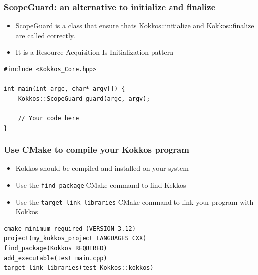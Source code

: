 \documentclass[aspectratio=169]{beamer}
\begin{document}

\begin{frame}[fragile]
    \frametitle{ScopeGuard: an alternative to initialize and finalize} 

    \begin{itemize}
        \item ScopeGuard is a class that ensure thats Kokkos::initialize and Kokkos::finalize are called correctly.
        \item It is a Resource Acquisition Is Initialization pattern
    \end{itemize}

\begin{verbatim}
#include <Kokkos_Core.hpp>
    
int main(int argc, char* argv[]) {
    Kokkos::ScopeGuard guard(argc, argv);
        
    // Your code here
}
\end{verbatim}

\end{frame}


\begin{frame}[fragile]

\frametitle{Use CMake to compile your Kokkos program}

\begin{itemize}
    \item Kokkos should be compiled and installed on your system
    \item Use the \texttt{find\_package} CMake command to find Kokkos
    \item Use the \texttt{target\_link\_libraries} CMake command to link your program with Kokkos
\end{itemize}

\begin{verbatim}
cmake_minimum_required (VERSION 3.12)
project(my_kokkos_project LANGUAGES CXX)
find_package(Kokkos REQUIRED)
add_executable(test main.cpp)
target_link_libraries(test Kokkos::kokkos)
\end{verbatim}

\end{frame}

\end{document}
